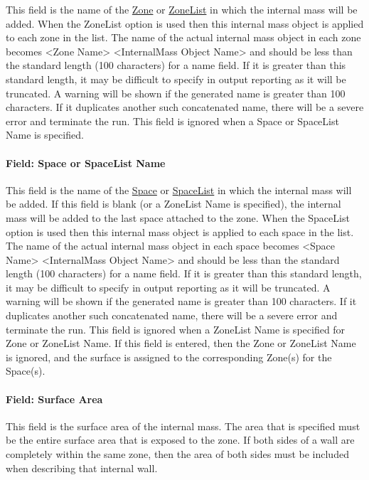 This field is the name of the \hyperref[zone]{Zone} or \hyperref[zonelist]{ZoneList} in which the internal mass will be added. When the ZoneList option is used then this internal mass object is applied to each zone in the list. The name of the actual internal mass object in each zone becomes <Zone Name> <InternalMass Object Name> and should be less than the standard length (100 characters) for a name field. If it is greater than this standard length, it may be difficult to specify in output reporting as it will be truncated. A warning will be shown if the generated name is greater than 100 characters. If it duplicates another such concatenated name, there will be a severe error and terminate the run. This field is ignored when a Space or SpaceList Name is specified.

\paragraph{Field: Space or SpaceList Name}\label{field-space-or-spacelist-name-14}

This field is the name of the \hyperref[space]{Space} or \hyperref[spacelist]{SpaceList} in which the internal mass will be added. If this field is blank (or a ZoneList Name is specified), the internal mass will be added to the last space attached to the zone. When the SpaceList option is used then this internal mass object is applied to each space in the list. The name of the actual internal mass object in each space becomes <Space Name> <InternalMass Object Name> and should be less than the standard length (100 characters) for a name field. If it is greater than this standard length, it may be difficult to specify in output reporting as it will be truncated. A warning will be shown if the generated name is greater than 100 characters. If it duplicates another such concatenated name, there will be a severe error and terminate the run. This field is ignored when a ZoneList Name is specified for Zone or ZoneList Name. If this field is entered, then the Zone or ZoneList Name is ignored, and the surface is assigned to the corresponding Zone(s) for the Space(s).

\paragraph{Field: Surface Area}\label{field-surface-area}

This field is the surface area of the internal mass. The area that is specified must be the entire surface area that is exposed to the zone. If both sides of a wall are completely within the same zone, then the area of both sides must be included when describing that internal wall.

